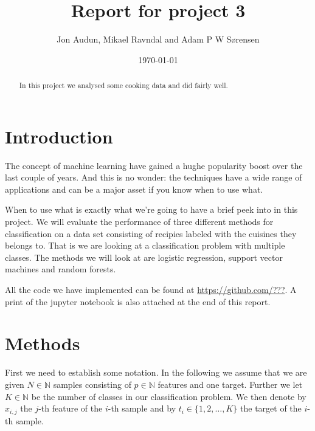 \documentclass[parskip=half]{scrartcl}
\title{Report for project 3}
\date{\today}
\author{Jon Audun, Mikael Ravndal and Adam P W S{\o}rensen}
\theoremstyle{definition}
\theoremstyle{remark}
\newcommand{\N}{\mathbb{N}}
\begin{document}

\maketitle

\begin{abstract}
In this project we analysed some cooking data and did fairly well. 
\end{abstract}


\section{Introduction}
The concept of machine learning have gained a hughe popularity boost over 
the last couple of years. And this is no wonder: the techniques 
have a wide range of applications and can be a major asset
if you know when to use what.
\par
When to use what is exactly what we're going to have a brief
peek into in this project. 
We will evaluate the performance of three different methods for
classification on a data set consisting of recipies labeled with 
the cuisines they belongs to. That is we are looking at a classification 
problem with multiple classes. The methods we will look at are
logistic regression, support vector machines and random forests.
\begin{framed}
All the code we have implemented can be found at \url{https://github.com/???}.
A print of the jupyter notebook is also attached at the end of this report.
\end{framed}

\section{Methods} \label{sec:methods}
First we need to establish some notation. In the following we assume
that we are given $N \in \N$ samples consisting of $p \in \N$ features
and one target. Further we let $K \in \N$ be the number of
classes in our classification problem. We then denote by $x_{i,j}$ the
$j$-th feature of the $i$-th sample and by $t_i \in \{1,2, \dots, K\}$
the target of the $i$-th sample. 
\end{document}
